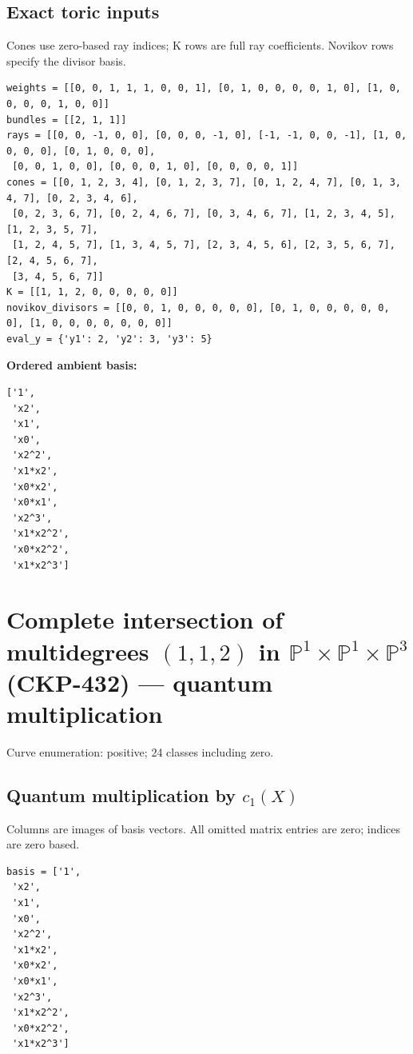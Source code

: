 \documentclass[10pt,a4paper]{article}
\begin{document}
\subsection*{Exact toric inputs}
Cones use zero-based ray indices; K rows are full ray coefficients. Novikov rows specify the divisor basis.

\begin{lstlisting}
weights = [[0, 0, 1, 1, 1, 0, 0, 1], [0, 1, 0, 0, 0, 0, 1, 0], [1, 0, 0, 0, 0, 1, 0, 0]]
bundles = [[2, 1, 1]]
rays = [[0, 0, -1, 0, 0], [0, 0, 0, -1, 0], [-1, -1, 0, 0, -1], [1, 0, 0, 0, 0], [0, 1, 0, 0, 0],
 [0, 0, 1, 0, 0], [0, 0, 0, 1, 0], [0, 0, 0, 0, 1]]
cones = [[0, 1, 2, 3, 4], [0, 1, 2, 3, 7], [0, 1, 2, 4, 7], [0, 1, 3, 4, 7], [0, 2, 3, 4, 6],
 [0, 2, 3, 6, 7], [0, 2, 4, 6, 7], [0, 3, 4, 6, 7], [1, 2, 3, 4, 5], [1, 2, 3, 5, 7],
 [1, 2, 4, 5, 7], [1, 3, 4, 5, 7], [2, 3, 4, 5, 6], [2, 3, 5, 6, 7], [2, 4, 5, 6, 7],
 [3, 4, 5, 6, 7]]
K = [[1, 1, 2, 0, 0, 0, 0, 0]]
novikov_divisors = [[0, 0, 1, 0, 0, 0, 0, 0], [0, 1, 0, 0, 0, 0, 0, 0], [1, 0, 0, 0, 0, 0, 0, 0]]
eval_y = {'y1': 2, 'y2': 3, 'y3': 5}
\end{lstlisting}

\textbf{Ordered ambient basis:}
\begin{lstlisting}
['1',
 'x2',
 'x1',
 'x0',
 'x2^2',
 'x1*x2',
 'x0*x2',
 'x0*x1',
 'x2^3',
 'x1*x2^2',
 'x0*x2^2',
 'x1*x2^3']
\end{lstlisting}

\clearpage\section*{Complete intersection of multidegrees $(1,1,2)$ in $\mathbb P^{1}\times \mathbb P^{1}\times \mathbb P^{3}$ (CKP-432) --- quantum multiplication}

Curve enumeration: positive; 24 classes including zero.
\subsection*{Quantum multiplication by $c_1(X)$}
Columns are images of basis vectors. All omitted matrix entries are zero; indices are zero based.

\begin{lstlisting}
basis = ['1',
 'x2',
 'x1',
 'x0',
 'x2^2',
 'x1*x2',
 'x0*x2',
 'x0*x1',
 'x2^3',
 'x1*x2^2',
 'x0*x2^2',
 'x1*x2^3']
\end{lstlisting}
\end{document}
